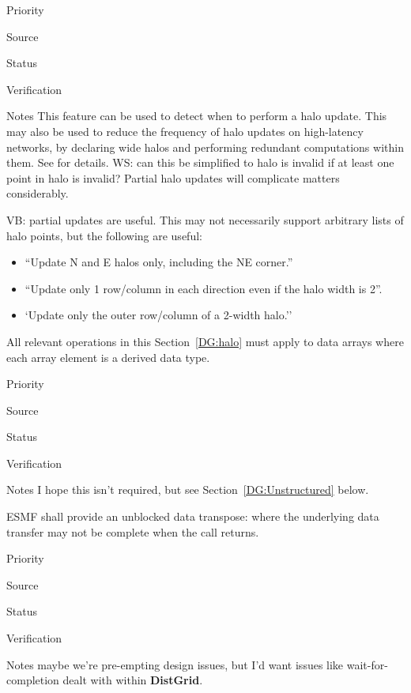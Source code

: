 \begin{reqlist}
\item[Priority]
\item[Source]
\item[Status]
\item[Verification]
\item[Notes] This feature can be used to detect when to perform a halo
  update. This may also be used to reduce the frequency of halo
  updates on high-latency networks, by declaring wide halos and
  performing redundant computations within them. See \cite{ref:b2001}
  for details.  WS:  can this be simplified to halo is invalid
  if at least one point in halo is invalid?  Partial halo updates
  will complicate matters considerably.

  VB: partial updates are useful. This may not necessarily support
  arbitrary lists of halo points, but the following are useful:
  \begin{itemize}
  \item ``Update N and E halos only, including the NE corner.''
  \item ``Update only 1 row/column in each direction even if the halo
    width is 2''.
  \item `Update only the outer row/column of a 2-width halo.''
  \end{itemize}
\end{reqlist}


All relevant operations in this Section~\ref{DG:halo} must apply to
data arrays where each array element is a derived data type.

\begin{reqlist}
\item[Priority]
\item[Source]
\item[Status]
\item[Verification]
\item[Notes] I hope this isn't required, but see
  Section~\ref{DG:Unstructured} below.
\end{reqlist}

 \label{DG:transpose}


ESMF shall provide an unblocked data transpose: where the underlying
data transfer may not be complete when the call returns.

\begin{reqlist}
\item[Priority]
\item[Source]
\item[Status]
\item[Verification]
\item[Notes] maybe we're pre-empting design issues, but I'd want
  issues like wait-for-completion dealt with within \textbf{DistGrid}.
\end{reqlist}

